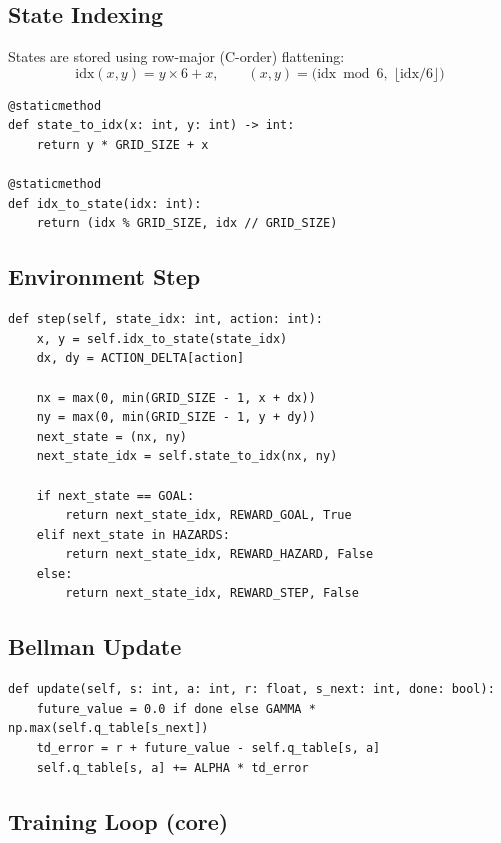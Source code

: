 \documentclass[12pt]{article}
\begin{document}
\subsection{State Indexing}

States are stored using row-major (C-order) flattening:
\[
    \text{idx}(x, y) = y \times 6 + x, \qquad
    (x, y) = \bigl(\text{idx} \bmod 6,\;\lfloor\text{idx}/6\rfloor\bigr)
\]

\begin{lstlisting}[caption={State encoding in WarehouseEnv.}]
@staticmethod
def state_to_idx(x: int, y: int) -> int:
    return y * GRID_SIZE + x

@staticmethod
def idx_to_state(idx: int):
    return (idx % GRID_SIZE, idx // GRID_SIZE)
\end{lstlisting}

\subsection{Environment Step}

\begin{lstlisting}[caption={Transition and reward logic in WarehouseEnv.step.}]
def step(self, state_idx: int, action: int):
    x, y = self.idx_to_state(state_idx)
    dx, dy = ACTION_DELTA[action]

    nx = max(0, min(GRID_SIZE - 1, x + dx))
    ny = max(0, min(GRID_SIZE - 1, y + dy))
    next_state = (nx, ny)
    next_state_idx = self.state_to_idx(nx, ny)

    if next_state == GOAL:
        return next_state_idx, REWARD_GOAL, True
    elif next_state in HAZARDS:
        return next_state_idx, REWARD_HAZARD, False
    else:
        return next_state_idx, REWARD_STEP, False
\end{lstlisting}

\subsection{Bellman Update}

\begin{lstlisting}[caption={Q-value update in QLearningAgent.update.}]
def update(self, s: int, a: int, r: float, s_next: int, done: bool):
    future_value = 0.0 if done else GAMMA * np.max(self.q_table[s_next])
    td_error = r + future_value - self.q_table[s, a]
    self.q_table[s, a] += ALPHA * td_error
\end{lstlisting}

\subsection{Training Loop (core)}
\end{document}
